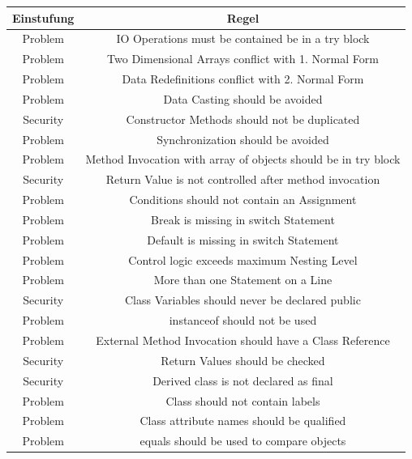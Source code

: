 \documentclass[da,ngerman]{stthesis}
\begin{document}
				\begin{center}
					\tabulinesep=1.5mm
					\begin{longtabu}{|c|c|}
						\hline
  						\textbf{Einstufung} & \textbf{Regel}\\
  						\hline
						Problem & IO Operations must be contained be in a try block \\
						\hline
						Problem & Two Dimensional Arrays conflict with 1. Normal Form \\
						\hline
						Problem & Data Redefinitions conflict with 2. Normal Form \\
						\hline
						Problem & Data Casting should be avoided \\
						\hline
						Security & Constructor Methods should not be duplicated \\
						\hline
						Problem & Synchronization should be avoided \\
						\hline
						Problem & Method Invocation with array of objects should be in try block \\
						\hline
						Security & Return Value is not controlled after method invocation \\
						\hline
						Problem & Conditions should not contain an Assignment \\
						\hline
						Problem & Break is missing in switch Statement \\
						\hline
						Problem & Default is missing in switch Statement \\
						\hline
						Problem & Control logic exceeds maximum Nesting Level \\
						\hline
						Problem & More than one Statement on a Line \\
						\hline
						Security & Class Variables should never be declared public \\
						\hline
						Problem & instanceof should not be used \\
						\hline
						Problem & External Method Invocation should have a Class Reference \\
						\hline
						Security & Return Values should be checked \\
						\hline
						Security & Derived class is not declared as final \\
						\hline
						Problem & Class should not contain labels \\
						\hline
						Problem & Class attribute names should be qualified \\
						\hline
						Problem & equals should be used to compare objects \\

\end{longtabu}
\end{center}
\end{document}
